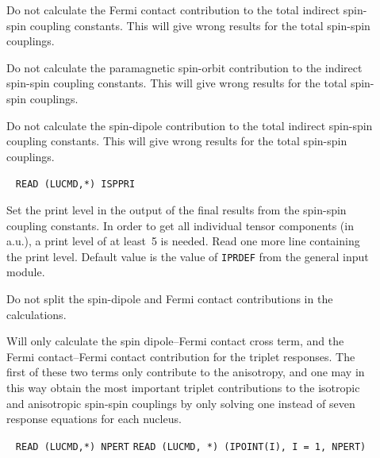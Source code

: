 \begin{description}
\item[] Do not calculate the Fermi
contact contribution
to the total indirect spin-spin coupling
constants. This will give
wrong results for the total spin-spin couplings.

\item[] Do not calculate the paramagnetic
spin-orbit contribution to the indirect
spin-spin coupling constants. This will
give wrong results for the total spin-spin couplings.

\item[] Do not calculate the spin-dipole
contribution to
the total indirect spin-spin coupling
constants. This will give wrong
results for the total spin-spin couplings.

\item[]\verb| |\newline
\verb|READ (LUCMD,*) ISPPRI|

Set the print level in the output of the final results from the
spin-spin coupling constants. In order to get all individual tensor
components (in a.u.), a print level of at least~5 is needed. Read one
more line containing the print level. Default value is the value
of \verb|IPRDEF| from the general input module.

\item[] Do not split the
spin-dipole and Fermi
contact contributions in the calculations.

\item[]

Will only calculate the spin
dipole--Fermi contact cross
term, and the
Fermi contact--Fermi contact contribution for the triplet
responses. The first of these two terms only contribute to the
anisotropy, and one may in this way obtain the most important triplet
contributions to the isotropic and
anisotropic
spin-spin couplings by only solving one instead of seven response
equations for each nucleus.

\item[]\verb| |\newline
\verb|READ (LUCMD,*) NPERT|\newline
\verb|READ (LUCMD, *) (IPOINT(I), I = 1, NPERT)|


\end{description}
